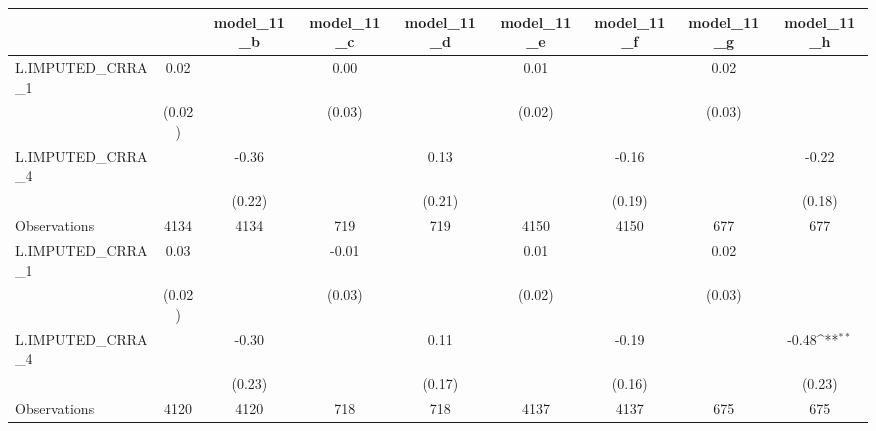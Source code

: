 {
\def\sym#1{\ifmmode^{#1}\else\(^{#1}\)\fi}
\begin{tabular}{l*{8}{c}}
\toprule
                &\multicolumn{1}{c}{}&\multicolumn{1}{c}{model\_11\_b}&\multicolumn{1}{c}{model\_11\_c}&\multicolumn{1}{c}{model\_11\_d}&\multicolumn{1}{c}{model\_11\_e}&\multicolumn{1}{c}{model\_11\_f}&\multicolumn{1}{c}{model\_11\_g}&\multicolumn{1}{c}{model\_11\_h}\\
\midrule
L.IMPUTED\_CRRA\_1&     0.02         &                  &     0.00         &                  &     0.01         &                  &     0.02         &                  \\
                &   (0.02)         &                  &   (0.03)         &                  &   (0.02)         &                  &   (0.03)         &                  \\
\addlinespace
L.IMPUTED\_CRRA\_4&                  &    -0.36         &                  &     0.13         &                  &    -0.16         &                  &    -0.22         \\
                &                  &   (0.22)         &                  &   (0.21)         &                  &   (0.19)         &                  &   (0.18)         \\
\midrule
Observations    &     4134         &     4134         &      719         &      719         &     4150         &     4150         &      677         &      677         \\



\midrule
L.IMPUTED\_CRRA\_1&     0.03         &                  &    -0.01         &                  &     0.01         &                  &     0.02         &                  \\
                &   (0.02)         &                  &   (0.03)         &                  &   (0.02)         &                  &   (0.03)         &                  \\
\addlinespace
L.IMPUTED\_CRRA\_4&                  &    -0.30         &                  &     0.11         &                  &    -0.19         &                  &    -0.48\sym{**} \\
                &                  &   (0.23)         &                  &   (0.17)         &                  &   (0.16)         &                  &   (0.23)         \\
\midrule
Observations    &     4120         &     4120         &      718         &      718         &     4137         &     4137         &      675         &      675         \\





\end{tabular}}
